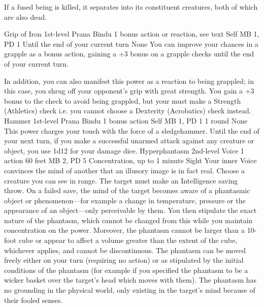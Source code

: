 If a fused being is killed, it separates into its constituent
creatures, both of which are also dead.

\DndPowerHeader%
    {Grip of Iron\label{pwr:grip-of-iron}}
    {1st-level Prana Bindu}
    {1 bonus action or reaction, see text}
    {Self}
    {MB 1, PD 1}
    {Until the end of your current turn}
    {None}
You can improve your chances in a grapple
as a bonus action, gaining a +3 bonus on a grapple checks
until the end of your current turn.

In addition, you can also manifest this power as a reaction
to being grappled; in this case, you shrug off your opponent's
grip with great strength. You gain a +3 bonus to the check
to avoid being grappled, but your must make a
Strength (Athletics) check
i.e. you cannot choose a Dexterity (Acrobatics) check instead.
\DndPowerHeader%
    {Hammer\label{pwr:hammer}}
    {1st-level Prana Bindu}
    {1 bonus action}
    {Self}
    {MB 1, PD 1}
    {1 round}
    {None}
This power charges your touch with the force
of a sledgehammer. Until the end of your next turn, if you
make a successful unarmed attack against any creature or object,
you use 1d12 for your damage dice.
\DndPowerHeader%
    {Hyperphantasm\label{pwr:hyperphantasm}}
    {2nd-level Voice}
    {1 action}
    {60 feet}
    {MB 2, PD 5}
    {Concentration, up to 1 minute}
    {Sight}
Your inner Voice convinces the mind of another that an illusory image
is in fact real. Choose a creature you can see in range.
The target must make an Intelligence saving throw.
On a failed save, the mind of the target becomes aware of a phantasmic
object or phenomenon---for example a change in temperature, pressure
or the appearance of an object---only perceivable by them.
You then stipulate the exact nature of the phantasm,
which cannot be changed from this while you maintain concentration
on the power. Moreover, the phantasm cannot be larger than a 10-foot cube
or appear to affect a volume greater than the extent of the cube,
whichever applies, and cannot be discontinuous.
The phantasm can be moved freely either on your turn (requiring no action)
or as stipulated by the initial conditions of the phantasm
(for example if you specified the phantasm to be a wicker basket
over the target's head which moves with them).
The phantasm has no grounding in the physical world,
only existing in the target's mind because of their fooled senses.

